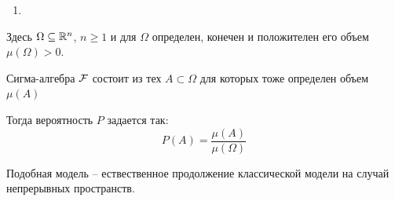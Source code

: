 \begin{enumerate}[resume*=models]
	\item {}
\end{enumerate}

Здесь $\Omega \subseteq \mathbb{R}^n$, $n \geq 1$ и для $\Omega$ определен, конечен и положителен его объем $\mu(\Omega) > 0.$

Сигма-алгебра $\mathcal{F}$ состоит из тех $A \subset \Omega$ для которых тоже определен объем $\mu(A)$

Тогда вероятность $P$ задается так:
\begin{equation*}
	P(A) = \frac{\mu(A)}{\mu(\Omega)}
\end{equation*} 

Подобная модель -- ествественное продолжение классической модели на случай непрерывных пространств.

